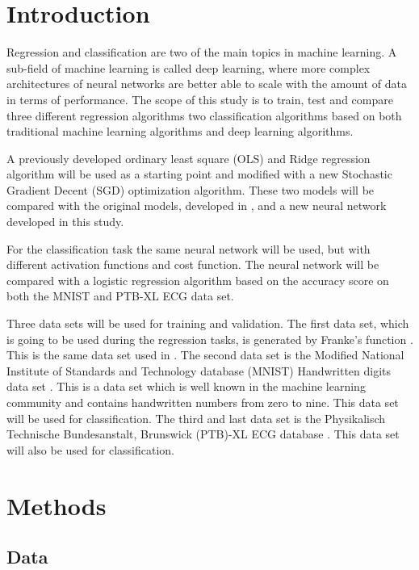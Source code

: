 \documentclass[twocolumn]{cinc}
\begin{document}
\section{Introduction}
Regression and classification are two of the main topics in machine learning. A sub-field of machine learning is called deep learning, where more complex architectures of neural networks are better able to scale with the amount of data in terms of performance. The scope of this study is to train, test and compare three different regression algorithms two classification algorithms based on both traditional machine learning algorithms and deep learning algorithms.

A previously developed ordinary least square (OLS) and Ridge regression algorithm\cite{bjorn-jostein_singstad_using_nodate} will be used as a starting point and modified with a new Stochastic Gradient Decent (SGD) optimization algorithm. These two models will be compared with the original models, developed in  \cite{bjorn-jostein_singstad_using_nodate}, and a new neural network developed in this study. 

For the classification task the same neural network will be used, but with different activation functions and cost function. The neural network will be compared with a logistic regression algorithm based on the accuracy score on both the MNIST and PTB-XL ECG data set.

Three data sets will be used for training and validation. The first data set, which is going to be used during the regression tasks, is generated by Franke's function \cite{franke_r_critical_1979}. This is the same data set used in \cite{bjorn-jostein_singstad_using_nodate}. The second data set is the Modified National Institute of Standards and Technology database (MNIST) Handwritten digits data set \cite{lecun_mnist_2010}. This is a data set which is well known in the machine learning community and contains handwritten numbers from zero to nine. This data set will be used for classification. The third and last data set is the Physikalisch Technische Bundesanstalt, Brunswick (PTB)-XL ECG database \cite{wagner_ptb-xl_2020-1, goldberger_physiobank_2000}. This data set will also be used for classification.



\section{Methods}
\subsection{Data}
\end{document}
